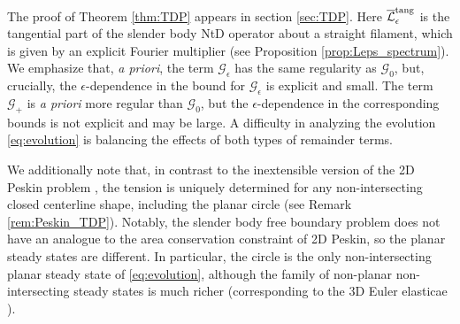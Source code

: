 \documentclass[11pt,reqno]{amsart}
\newcommand{\mc}[1]{\mathcal{#1}}
\theoremstyle{definition}
\begin{document}
%
%
The proof of Theorem \ref{thm:TDP} appears in section \ref{sec:TDP}. 
Here $\overline{\mc{L}}_\epsilon^{\rm tang}$ is the tangential part of the slender body NtD operator about a straight filament, which is given by an explicit Fourier multiplier (see Proposition \ref{prop:Leps_spectrum}).
We emphasize that, \emph{a priori}, the term $\mc{G}_\epsilon$ has the same regularity as $\mc{G}_0$, but, crucially, the $\epsilon$-dependence in the bound for $\mc{G}_\epsilon$ is explicit and small. The term $\mc{G}_+$ is \emph{a priori} more regular than $\mc{G}_0$, but the $\epsilon$-dependence in the corresponding bounds is not explicit and may be large.
A difficulty in analyzing the evolution \eqref{eq:evolution} is balancing the effects of both types of remainder terms.


We additionally note that, in contrast to the inextensible version of the 2D Peskin problem \cite{kuo2023tension, garcia2025immersed}, the tension is uniquely determined for any non-intersecting closed centerline shape, including the planar circle (see Remark \ref{rem:Peskin_TDP}). Notably, the slender body free boundary problem does not have an analogue to the area conservation constraint of 2D Peskin, so the planar steady states are different. In particular, the circle is the only non-intersecting planar steady state of \eqref{eq:evolution}, although the family of non-planar non-intersecting steady states is much richer (corresponding to the 3D Euler elasticae \cite{EulerOriginal,levien2008elastica,matsutani2010euler}).
\end{document}
